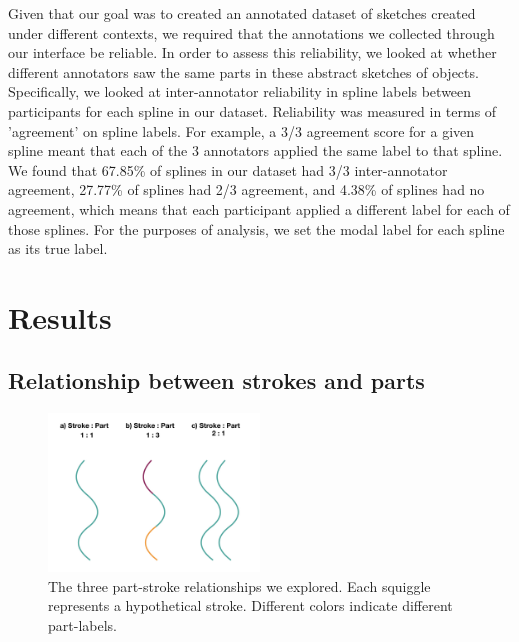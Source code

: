 \documentclass[10pt,letterpaper]{article}
\begin{document}
Given that our goal was to created an annotated dataset of sketches created under different contexts, we required that the annotations we collected through our interface be reliable. In order to assess this reliability, we looked at whether different annotators saw the same parts in these abstract sketches of objects. Specifically, we looked at inter-annotator reliability in spline labels between participants for each spline in our dataset. Reliability was measured in terms of 'agreement' on spline labels. For example, a 3/3 agreement score for a given spline meant that each of the 3 annotators applied the same label to that spline. We found that 67.85\% of splines in our dataset had 3/3 inter-annotator agreement, 27.77\% of splines had 2/3 agreement, and 4.38\% of splines had no agreement, which means that each participant applied a different label for each of those splines.
For the purposes of analysis, we set the modal label for each spline as its true label.

\section{Results}

\subsection{Relationship between strokes and parts}

\begin{figure}
\centering
\includegraphics[width=0.5\textwidth]{figures/Part-Stroke.jpeg}
\caption{The three part-stroke relationships we explored. Each squiggle represents a hypothetical stroke. Different colors indicate different part-labels.}
\end{figure}
\end{document}
